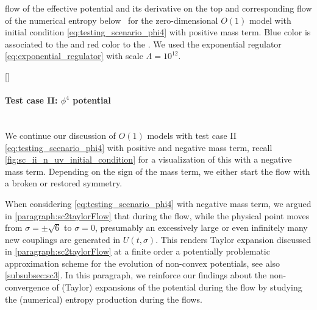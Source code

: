	{%
		\caption{
			\frg{} flow of the effective potential and its derivative on the top  and corresponding flow of the numerical entropy below~ for the zero-dimensional $O(1)$ model with initial condition \eqref{eq:testing_scenario_phi4} with positive mass term.
			{Blue} color is associated to the \uv{} and {red} color to the \ir{}.
			We used the exponential regulator \cref{eq:exponential_regulator} with \uv{} scale $\Lambda = 10^{12}$.
		}\label{fig:sc_ii_p_on=1_n=800_xmax=10_lambda=1.0e12_tir=60}
	}%
	[]\FloatBarrier
\paragraph{Test case II: \texorpdfstring{$\phi^4$}{phi**4} potential}\label{paragraph:sc2O1}\mbox{}\\%
We continue our discussion of $O(1)$ models with test case II \eqref{eq:testing_scenario_phi4} with positive and negative mass term, recall \cref{fig:sc_ii_n_uv_initial_condition} for a visualization of this \ic{} with a negative mass term.
Depending on the sign of the mass term, we either start the \frg{} flow with a broken or restored \ZII{} symmetry.

When considering \cref{eq:testing_scenario_phi4} with negative mass term, we argued in \cref{paragraph:sc2taylorFlow} that during the \frg{} flow, while the physical point moves from $\sigma = \pm \sqrt{6}$ to $\sigma = 0$, presumably an excessively large or even infinitely many new couplings are generated in $U ( t, \sigma )$. 
This renders \frg{} Taylor expansion discussed in \cref{paragraph:sc2taylorFlow} at a finite order a potentially problematic approximation scheme for the evolution of non-convex potentials, see also \cref{subsubsec:sc3}.
In this paragraph, we reinforce our findings about the non-convergence of (Taylor) expansions of the potential during the \frg{} flow by studying the (numerical) entropy production during the \frg{} flows.

